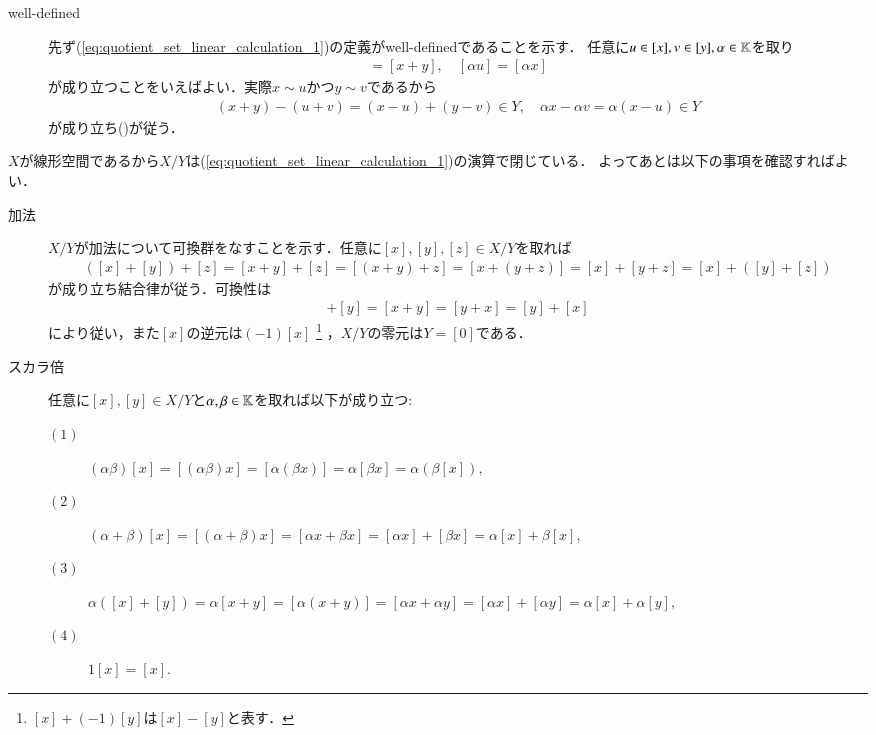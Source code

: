 	\begin{prf}\mbox{}
		\begin{description}
			\item[well-defined]
				先ず(\ref{eq:quotient_set_linear_calculation_1})の定義がwell-definedであることを示す．
				任意に$u \in [x],v \in [y],\alpha \in \mathbb{K}$を取り
				\begin{align}
					[u + v] = [x + y], \quad [\alpha u] = [\alpha x]
					\label{eq:quotient_set_linear_calculation_2}
				\end{align}
				が成り立つことをいえばよい．実際$x \sim u$かつ$y \sim v$であるから
				\begin{align}
					(x + y) - (u + v) = (x - u) + (y - v) \in Y,
					\quad \alpha x - \alpha v = \alpha(x - u) \in Y
					\end{align}
				が成り立ち()が従う．
		\end{description}
		$X$が線形空間であるから$X/Y$は(\ref{eq:quotient_set_linear_calculation_1})の演算で閉じている．
		よってあとは以下の事項を確認すればよい．
		\begin{description}
			\item[加法]
				$X/Y$が加法について可換群をなすことを示す．任意に$[x],[y],[z] \in X/Y$を取れば
				\begin{align}
					([x]+[y]) + [z] = [x+y] + [z] = [(x+y) + z] = [x + (y+z)] = [x] + [y+z] = [x] + ([y]+[z])
				\end{align}
				が成り立ち結合律が従う．可換性は
				\begin{align}
					[x] + [y] = [x + y] = [y + x] = [y] + [x]
				\end{align}
				により従い，また$[x]$の逆元は$(-1)[x]$
				\footnote{
					$[x] + (-1)[y]$は$[x] - [y]$と表す．
				}
				，$X/Y$の零元は$Y = [0]$である．
				
			\item[スカラ倍]
				任意に$[x],[y] \in X/Y$と$\alpha,\beta \in \mathbb{K}$を取れば以下が成り立つ:
				\begin{description}
					\item[$(1)$] $(\alpha\beta)[x] = [(\alpha\beta)x] = [\alpha(\beta x)] = \alpha[\beta x] = \alpha(\beta [x]),$
					\item[$(2)$] $(\alpha + \beta)[x] = [(\alpha + \beta)x] = [\alpha x + \beta x] = [\alpha x] + [\beta x] = \alpha [x] + \beta [x],$
					\item[$(3)$] $\alpha ([x] + [y]) = \alpha [x+y] = [\alpha(x+y)] = [\alpha x + \alpha y] = [\alpha x] + [\alpha y] = \alpha [x] + \alpha [y],$
					\item[$(4)$] $1 [x] = [x].$
					\QED
				\end{description}
		\end{description}
	\end{prf}
	
